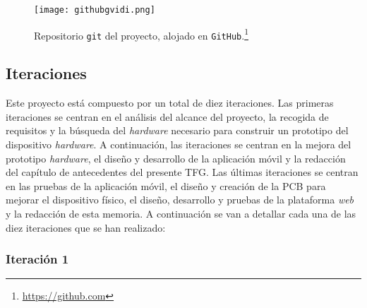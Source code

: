\begin{figure}[!h]
\begin{center}
\texttt{[image: githubgvidi.png]}
\caption{Repositorio \texttt{git} del proyecto, alojado en \texttt{GitHub}.\footnote{\url{https://github.com}}}
\label{fig:githubgvidi}
\end{center}
\end{figure}


\subsection{Iteraciones}

Este proyecto está compuesto por un total de diez iteraciones. Las primeras iteraciones se centran en el análisis del alcance del proyecto, la recogida de requisitos y la búsqueda del \textit{hardware} necesario para construir un prototipo del dispositivo \textit{hardware}. A continuación, las iteraciones se centran en la mejora del prototipo \textit{hardware}, el diseño y desarrollo de la aplicación móvil y la redacción del capítulo de antecedentes del presente \ac{TFG}. Las últimas iteraciones se centran en las pruebas de la aplicación móvil, el diseño y creación de la \ac{PCB} para mejorar el dispositivo físico, el diseño, desarrollo y pruebas de la plataforma \textit{web} y la redacción de esta memoria. A continuación se van a detallar cada una de las diez iteraciones que se han realizado:

\subsubsection{Iteración 1}

